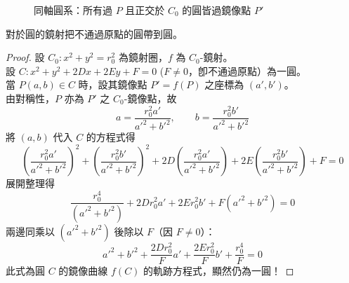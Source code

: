 \begin{figure}[htbp]
\centering
{}
\caption{同軸圓系：所有過 $P$ 且正交於 $C_0$ 的圓皆過鏡像點 $P'$}
\label{fig:b4s-3-41}
\end{figure}

\begin{theorem}
對於圓的鏡射把不通過原點的圓帶到圓。
\end{theorem}

\begin{proof}
設 $C_0 : x^2 + y^2 = r_0^2$ 為鏡射圈，$f$ 為 $C_0$-鏡射。\\
設 $C : x^2 + y^2 + 2Dx + 2Ey + F = 0$ ($F \neq 0$，卽不通過原點）為一圓。\\
當 $P(a,b) \in C$ 時，設其鏡像點 $P' = f(P)$ 之座標為 $(a', b')$。\\
由對稱性，$P$ 亦為 $P'$ 之 $C_0$-鏡像點，故
\[ a = \frac{r_0^2 a'}{a'^2 + b'^2}, \qquad b = \frac{r_0^2 b'}{a'^2 + b'^2} \]
將 $(a,b)$ 代入 $C$ 的方程式得
\[ \left(\frac{r_0^2 a'}{a'^2 + b'^2}\right)^2 + \left(\frac{r_0^2 b'}{a'^2 + b'^2}\right)^2 + 2D\left(\frac{r_0^2 a'}{a'^2 + b'^2}\right) + 2E\left(\frac{r_0^2 b'}{a'^2 + b'^2}\right) + F = 0 \]
展開整理得
\[ \frac{r_0^4}{(a'^2 + b'^2)} + 2Dr_0^2 a' + 2Er_0^2 b' + F(a'^2 + b'^2) = 0 \]
兩邊同乘以 $(a'^2 + b'^2)$ 後除以 $F$（因 $F \neq 0$）：
\[ a'^2 + b'^2 + \frac{2Dr_0^2}{F}a' + \frac{2Er_0^2}{F}b' + \frac{r_0^4}{F} = 0 \]
此式為圓 $C$ 的鏡像曲線 $f(C)$ 的軌跡方程式，顯然仍為一圓！
\end{proof}

